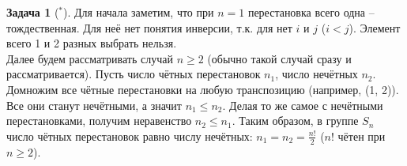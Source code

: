 \documentclass[12pt]{article}
\theoremstyle{definition}
\newtheorem{zad}{Задача}[section]
\begin{document}
\begin{zad}[$^*$]
Для начала заметим, что при $n=1$ перестановка всего одна -- тождественная. Для неё нет понятия инверсии, т.к. для нет $i$ и $j$ ($i<j$). Элемент всего 1 и 2 разных выбрать нельзя.\\
Далее будем рассматривать случай $n\geq 2$ (обычно такой случай сразу и рассматривается). Пусть число чётных перестановок $n_1$, число нечётных $n_2$. Домножим все чётные перестановки на любую транспозицию (например, (1, 2)). Все они станут нечётными, а значит $n_1\leq n_2$. Делая то же самое с нечётными перестановками, получим неравенство $n_2\leq n_1$. Таким образом, в группе $S_n$ число чётных перестановок равно числу нечётных: $n_1=n_2=\frac{n!}{2}$ ($n!$ чётен при $n\geq2$).
\end{zad}
\end{document}
